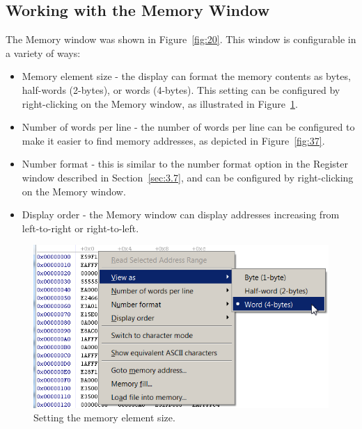 \documentclass[11pt, twoside, pdftex]{article}
\begin{document}
\subsection{Working with the Memory Window}
\label{sec:9.2}

The Memory window was shown in Figure~\ref{fig:20}. This window is
configurable in a variety of ways:

\begin{itemize}
\item Memory element size - the display can format the memory
contents as bytes, half-words (2-bytes), or words (4-bytes).
This setting can be configured by right-clicking on the Memory
window, as illustrated in Figure~\ref{fig:36}.

\item Number of words per line - the number of words per line can
be configured to make it easier to find memory addresses, as
depicted in Figure~\ref{fig:37}.

\item Number format - this is similar to the number format option in the Register window described in Section~\ref{sec:3.7},
and can be configured by right-clicking on the Memory window.

\item Display order - the Memory window can display addresses
increasing from left-to-right or right-to-left. 
\end{itemize}

\clearpage
\begin{figure}[H]
   \begin{center}
      \includegraphics[scale=1]{screenshots/figure36.png}
   \end{center}
   \caption{Setting the memory element size.} 
	 \label{fig:36}
\end{figure}
\end{document}

